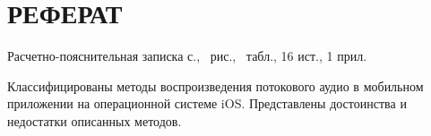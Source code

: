 \setupsectionstar
\section*{РЕФЕРАТ}
Расчетно-пояснительная записка \pageref{LastPage} с., \totalfigures\ рис., \totaltables\ табл., 16 ист., 1 прил.

Классифицированы методы воспроизведения потокового аудио в мобильном приложении на операционной системе iOS.
Представлены достоинства и недостатки описанных методов.

\pagebreak